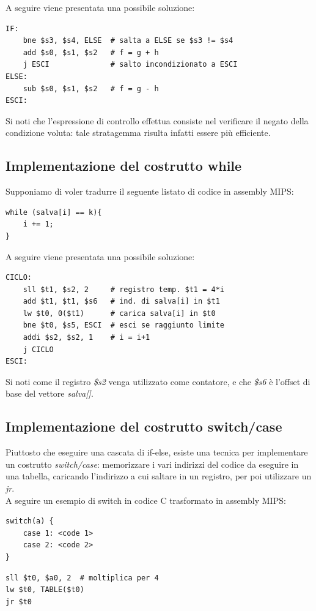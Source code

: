 \documentclass[class=book, crop=false]{standalone}
\begin{document}
A seguire viene presentata una possibile soluzione:
\begin{verbatim}
IF:
	bne $s3, $s4, ELSE  # salta a ELSE se $s3 != $s4
	add $s0, $s1, $s2   # f = g + h
	j ESCI              # salto incondizionato a ESCI
ELSE:
	sub $s0, $s1, $s2   # f = g - h
ESCI:
\end{verbatim}
Si noti che l'espressione di controllo effettua consiste nel verificare il negato della condizione voluta: tale stratagemma risulta infatti essere più efficiente.

\subsection{Implementazione del costrutto while}
Supponiamo di voler tradurre il seguente listato di codice in assembly MIPS:
\begin{verbatim}
while (salva[i] == k){
	i += 1;
}
\end{verbatim}

A seguire viene presentata una possibile soluzione:
\begin{verbatim}
CICLO:
	sll $t1, $s2, 2     # registro temp. $t1 = 4*i
	add $t1, $t1, $s6   # ind. di salva[i] in $t1
	lw $t0, 0($t1)      # carica salva[i] in $t0
	bne $t0, $s5, ESCI  # esci se raggiunto limite
	addi $s2, $s2, 1    # i = i+1
	j CICLO
ESCI:
\end{verbatim}
Si noti come il registro \emph{\$s2} venga utilizzato come contatore, e che \emph{\$s6} è l'offset di base del vettore \emph{salva[]}.

\subsection{Implementazione del costrutto switch/case}
Piuttosto che eseguire una cascata di if-else, esiste una tecnica per implementare un costrutto \emph{switch/case}: memorizzare i vari indirizzi del codice da eseguire in una tabella, caricando l'indirizzo a cui saltare in un registro, per poi utilizzare un \emph{jr}.\\
A seguire un esempio di switch in codice C trasformato in assembly MIPS:
\begin{verbatim}
switch(a) {
	case 1: <code 1>
	case 2: <code 2>
}
\end{verbatim}
\begin{verbatim}
sll $t0, $a0, 2  # moltiplica per 4
lw $t0, TABLE($t0)
jr $t0
\end{verbatim}
\end{document}
